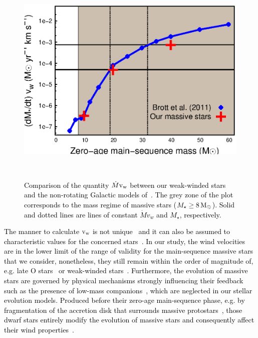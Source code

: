 \documentclass[useAMS,usenatbib]{mn2e}
\begin{document}
\begin{figure}
	\begin{minipage}[b]{ 0.47\textwidth}
		\includegraphics[width=1.0\textwidth]{./plot_brott.eps}
	\end{minipage} \\ 	
	\caption{   
	\textcolor{black}{
	Comparison of the quantity $\dot{M}\rm v_{w}$ between our weak-winded 
	stars and the non-rotating Galactic models of~\citet{brott_aa_530_2011a}. 
	The grey zone of the plot corresponds to the mass regime of massive stars ($M_{\star}\ge8\,\rm M_{\odot}$). 
	Solid and dotted lines are lines of constant $\dot{M} v_{w}$ and $M_{\star}$, respectively.
	}
		 }
	\label{fig:brot}  
\end{figure}


\textcolor{black}{
The manner to calculate $\rm v_{w}$ is not unique~\citep{castor_apj_195_1975,kudritzki_aa_219_1989,kudritzki_aa_38_2000, 
eldridge_mnras_367_2006} and it can also be assumed to characteristic 
values for the concerned stars~\citep{comeron_aa_338_1998,vanmarle_aa_561_2014,vanmarle_2015,
acreman_mnras_456_2016}. In our study, the wind velocities are in the lower 
limit of the range of validity for the main-sequence massive stars that we 
consider, nonetheless, they still remain within the order 
of magnitude of, e.g. late O stars~\citep{martins_aa_468_2007} or weak-winded 
stars~\citep{comeron_aa_338_1998}. Furthermore, the evolution of massive stars 
are governed by physical mechanisms strongly influencing their feedback such 
as the presence of low-mass companions~\citep{sana_sci_337_2012}, \textcolor{black}{which 
are neglected in our stellar evolution models. Produced before their zero-age 
main-sequence phase, e.g. by fragmentation of the accretion disk that surrounds 
massive protostars~\citep{2016arXiv160903402M}, those dwarf stars entirely 
modify the evolution of massive stars and consequently affect their wind 
properties~\citep{demink_aa_467_2007,demink_aa_497_2009,paxton_apjs_192_2011,marchant_aa_588_2016}}. 
}
\end{document}
